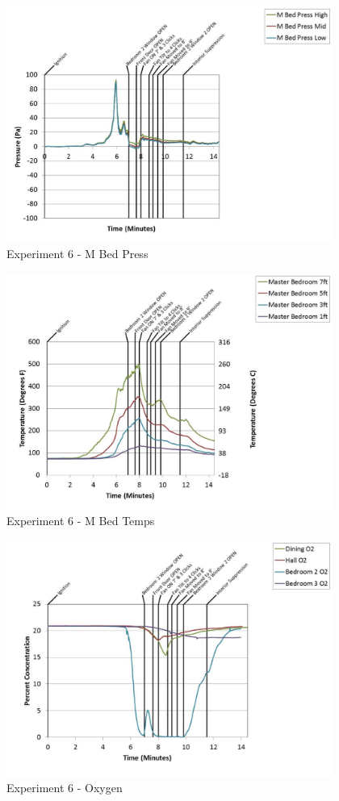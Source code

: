 \documentclass{article}
\begin{document}
\begin{appendices}
	\begin{figure}[h!]
		\centering
		\includegraphics[height=3.05in]{0_Images/Results_Charts/Exp_6_Charts/MBedPress.pdf}
		\caption{Experiment 6 - M Bed Press}
	\end{figure}
 
	\clearpage

	\begin{figure}[h!]
		\centering
		\includegraphics[height=3.05in]{0_Images/Results_Charts/Exp_6_Charts/MBedTemps.pdf}
		\caption{Experiment 6 - M Bed Temps}
	\end{figure}
 

	\begin{figure}[h!]
		\centering
		\includegraphics[height=3.05in]{0_Images/Results_Charts/Exp_6_Charts/Oxygen.pdf}
		\caption{Experiment 6 - Oxygen}
	\end{figure}
 

\end{appendices}
\end{document}
